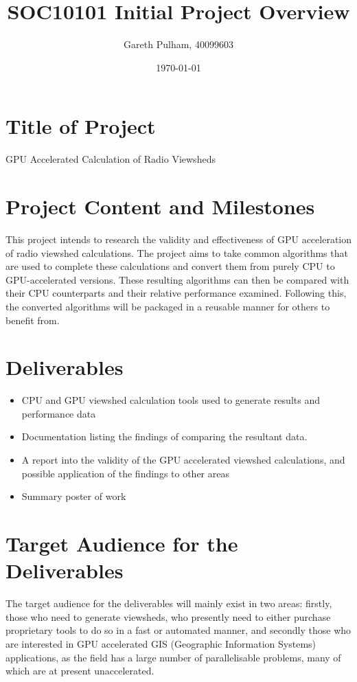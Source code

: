 \documentclass[a4paper]{article}
\begin{document}
    \begin{titlepage}
        \title{SOC10101 Initial Project Overview}
        \author{Gareth Pulham, 40099603}
        \date{\today}
        \maketitle
        \thispagestyle{empty}
    \end{titlepage}

    \section{Title of Project}
        GPU Accelerated Calculation of Radio Viewsheds

    \section{Project Content and Milestones}
        This project intends to research the validity and effectiveness of GPU acceleration of radio viewshed
        calculations. The project aims to take common algorithms that are used to complete these calculations and
        convert them from purely CPU to GPU-accelerated versions. These resulting algorithms can then be compared with
        their CPU counterparts and their relative performance examined. Following this, the converted algorithms will
        be packaged in a reusable manner for others to benefit from.
    \section{Deliverables}
        \begin{itemize}
            \item CPU and GPU viewshed calculation tools used to generate results and performance data
            \item Documentation listing the findings of comparing the resultant data.
            \item A report into the validity of the GPU accelerated viewshed calculations, and possible application of
                the findings to other areas
            \item Summary poster of work
        \end{itemize}
    \section{Target Audience for the Deliverables}
        The target audience for the deliverables will mainly exist in two areas: firstly, those who need to generate
        viewsheds, who presently need to either purchase proprietary tools to do so in a fast or automated manner, and
        secondly those who are interested in GPU accelerated GIS (Geographic Information Systems) applications, as the
        field has a large number of parallelisable problems, many of which are at present unaccelerated.
\end{document}
